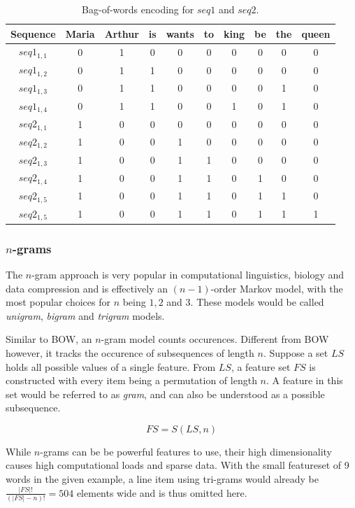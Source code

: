 \begin{table}[]
    \centering
    \begin{tabular}{c|ccccccccc}
        Sequence & Maria & Arthur & is & wants & to & king & be & the & queen\\
        \hline
        $seq1_{1,1}$ & 0 & 1 & 0 & 0 & 0 & 0 & 0 & 0 & 0\\
        $seq1_{1,2}$ & 0 & 1 & 1 & 0 & 0 & 0 & 0 & 0 & 0\\
        $seq1_{1,3}$ & 0 & 1 & 1 & 0 & 0 & 0 & 0 & 1 & 0\\
        $seq1_{1,4}$ & 0 & 1 & 1 & 0 & 0 & 1 & 0 & 1 & 0\\
        \hline
        $seq2_{1,1}$ & 1 & 0 & 0 & 0 & 0 & 0 & 0 & 0 & 0\\
        $seq2_{1,2}$ & 1 & 0 & 0 & 1 & 0 & 0 & 0 & 0 & 0\\
        $seq2_{1,3}$ & 1 & 0 & 0 & 1 & 1 & 0 & 0 & 0 & 0\\
        $seq2_{1,4}$ & 1 & 0 & 0 & 1 & 1 & 0 & 1 & 0 & 0\\
        $seq2_{1,5}$ & 1 & 0 & 0 & 1 & 1 & 0 & 1 & 1 & 0\\
        $seq2_{1,5}$ & 1 & 0 & 0 & 1 & 1 & 0 & 1 & 1 & 1\\
    \end{tabular}
    \caption{Bag-of-words encoding for $seq1$ and $seq2$.}
    \label{tab:bow-encoding}
\end{table}
\subsubsection*{$n$-grams}
The $n$-gram approach is very popular in computational linguistics, biology and data compression and is effectively an $(n-1)$-order Markov model, with the most popular choices for $n$ being $1,2$ and $3$. These models would be called \textit{unigram}, \textit{bigram} and \textit{trigram} models.

Similar to BOW, an $n$-gram model counts occurences. Different from BOW however, it tracks the occurence of subsequences of length $n$. Suppose a set $LS$ holds all possible values of a single feature. From $LS$, a feature set $FS$ is constructed with every item being a permutation of length $n$. A feature in this set would be referred to as \textit{gram}, and can also be understood as a possible subsequence.

$$
FS = S(LS, n)
$$

While $n$-grams can be be powerful features to use, their high dimensionality causes high computational loads and sparse data. With the small featureset of 9 words in the given example, a line item using tri-grams would already be $\frac{|FS|!}{(|FS|-n)!}=504$ elements wide and is thus omitted here.

